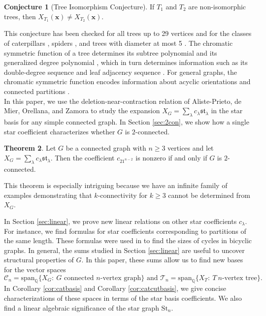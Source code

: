 \documentclass[12pt]{amsart}  %
\theoremstyle{definition}
\newtheorem{theorem}{Theorem}[section]
\newtheorem{conjecture}[theorem]{Conjecture}
\theoremstyle{remark}
\numberwithin{equation}{section}
\begin{document}
\begin{conjecture}[Tree Isomorphism Conjecture] \cite{chromsym} If $T_1$ and $T_2$ are non-isomorphic trees, then $X_{T_1}(\bm x)\neq X_{T_2}(\bm x)$.
\end{conjecture}

This conjecture has been checked for all trees up to 29 vertices \cite{algochromtrees} and for the classes of caterpillars \cite{catchromiso}, spiders \cite{distinguishingtrees}, and trees with diameter at most 5 \cite{chromstar}. The chromatic symmetric function of a tree determines its subtree polynomial \cite{distinguishingtrees} and its generalized degree polynomial \cite{chromtreepolyinv, vertweightgen}, which in turn determines information such as its double-degree sequence and leaf adjacency sequence \cite{gendegpol}. For general graphs, the chromatic symmetric function encodes information about acyclic orientations \cite{chromsym} and connected partitions \cite{conparts}. \\

In this paper, we use the deletion-near-contraction relation of Aliste-Prieto, de Mier, Orellana, and Zamora \cite{markedgraphs} to study the expansion $X_G=\sum_\lambda c_\lambda\mathfrak{st}_\lambda$ in the star basis for any simple connected graph. In Section \ref{sec:2con}, we show how a single star coefficient characterizes whether $G$ is $2$-connected. 
\begin{theorem}
Let $G$ be a connected graph with $n\geq 3$ vertices and let $X_G=\sum_\lambda c_\lambda\mathfrak{st}_\lambda$. Then the coefficient $c_{21^{n-2}}$ is nonzero if and only if $G$ is $2$-connected.
\end{theorem}
This theorem is especially intriguing because we have an infinite family of examples demonstrating that $k$-connectivity for $k\geq 3$ cannot be determined from $X_G$.

In Section \ref{sec:linear}, we prove new linear relations on other star coefficients $c_\lambda$. For instance, we find formulas for star coefficients corresponding to partitions of the same length.  These formulas were used in \cite{chromunicyclic} to find the sizes of cycles in bicyclic graphs.  In general, the sums studied in Section \ref{sec:linear} are useful to uncover structural properties of $G$. In this paper, these sums allow us to find new bases for the vector spaces
\begin{equation*}
\mathcal C_n=\text{span}_{\mathbb Q}\{X_G: \ G\text{ connected }n\text{-vertex graph}\}\text{ and }\mathcal T_n=\text{span}_{\mathbb Q}\{X_T: \ T \ n\text{-vertex tree}\}.
\end{equation*}
In Corollary \ref{cor:catbasis} and Corollary \ref{cor:catcutbasis}, we give concise characterizations of these spaces in terms of the star basis coefficients. We also find a linear algebraic significance of the star graph $\text{St}_n$.
\end{document}
